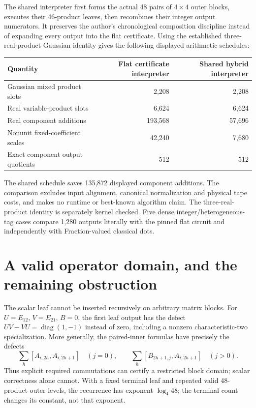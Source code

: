 \documentclass[11pt]{article}
\begin{document}
The shared interpreter first forms the actual 48 pairs of $4\times4$
outer blocks, executes their 46-product leaves, then recombines their
integer output numerators. It preserves the author's chronological
composition discipline instead of expanding every output into the flat
certificate. Using the established three-real-product Gaussian identity
gives the following displayed arithmetic schedules:
\begin{center}
\begin{tabular}{lrr}
\toprule
Quantity & Flat certificate interpreter & Shared hybrid interpreter\\
\midrule
Gaussian mixed product slots & 2,208 & 2,208\\
Real variable-product slots & 6,624 & 6,624\\
Real component additions & 193,568 & 57,696\\
Nonunit fixed-coefficient scales & 42,240 & 7,680\\
Exact component output quotients & 512 & 512\\
\bottomrule
\end{tabular}
\end{center}
The shared schedule saves 135,872 displayed component additions. The
comparison excludes input alignment, canonical normalization and physical
tape costs, and makes no runtime or best-known algorithm claim. The
three-real-product identity is separately kernel checked. Five dense
integer/heterogeneous-tag cases compare 1,280 outputs literally with the
pinned flat circuit and independently with Fraction-valued classical dots.

\section{A valid operator domain, and the remaining obstruction}
The scalar leaf cannot be inserted recursively on arbitrary matrix blocks.
For $U=E_{12}$, $V=E_{21}$, $B=0$, the first leaf output has the defect
$UV-VU=\operatorname{diag}(1,-1)$ instead of zero, including a nonzero
characteristic-two specialization. More generally, the paired-inner
formulas have precisely the defects
\[
 \sum_h[A_{i,2h},A_{i,2h+1}]
 \quad(j=0),\qquad
 \sum_h[B_{2h+1,j},A_{i,2h+1}]\quad(j>0).
\]
Thus explicit required commutations can certify a restricted block domain;
scalar correctness alone cannot. With a fixed terminal leaf and repeated
valid 48-product outer levels, the recurrence has exponent $\log_4 48$;
the terminal count changes its constant, not that exponent.
\end{document}
